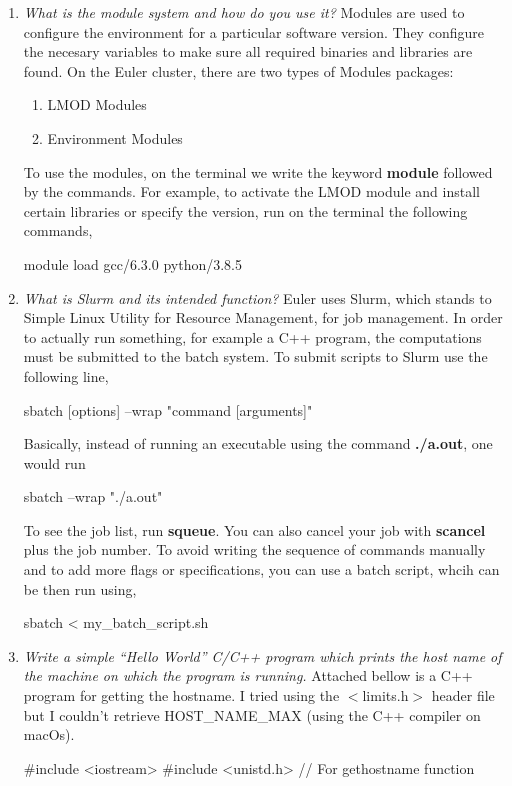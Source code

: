 \documentclass[unicode,11pt,a4paper,oneside,numbers=endperiod,openany]{scrartcl}
\begin{document}
\begin{enumerate}

    \item \textit{What is the module system and how do you use it?}
    Modules are used to configure the environment for a particular software version.
    They configure the necesary variables to make sure all required binaries and libraries are found. 
    On the Euler cluster, there are two types of Modules packages:
    \begin{enumerate}
        \item LMOD Modules
        \item Environment Modules 
    \end{enumerate}
    To use the modules, on the terminal we write the keyword \textbf{module} followed by the commands.
    For example, to activate the LMOD module and install certain libraries or specify the version,
    run on the terminal the following commands, 
    \begin{grayverbatim}
module load gcc/6.3.0 python/3.8.5
    \end{grayverbatim}

    \item \textit{What is Slurm and its intended function?}
    Euler uses Slurm, which stands to Simple Linux Utility for Resource Management, for job management.
    In order to actually run something, for example a C++ program, the computations must be
    submitted to the batch system. To submit scripts to Slurm use the following line,
    \begin{grayverbatim}
sbatch [options] --wrap "command [arguments]"
    \end{grayverbatim}
    Basically, instead of running an executable using the command \textbf{./a.out}, one would run 
    \begin{grayverbatim}
sbatch --wrap "./a.out"
    \end{grayverbatim}
    To see the job list, run \textbf{squeue}. You can also cancel your job with \textbf{scancel} 
    plus the job number.
    To avoid writing the sequence of commands manually and to add more flags or specifications, 
    you can use a batch script, whcih can be then run using,
    \begin{grayverbatim}
sbatch < my_batch_script.sh
    \end{grayverbatim}

    \item \textit{Write a simple “Hello World” C/C++ program which prints the host name of the 
    machine on which the program is running. }
    Attached bellow is a C++ program for getting the hostname. 
    I tried using the $<$limits.h$>$ header file but I couldn't retrieve HOST\_NAME\_MAX (using the C++ compiler on macOs).
    \begin{cppverbatim}
#include <iostream>
#include <unistd.h> // For gethostname function


\end{cppverbatim}
\end{enumerate}
\end{document}
